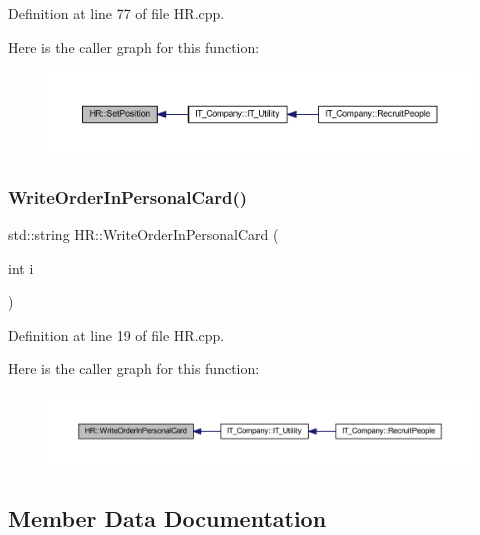 Definition at line 77 of file H\+R.\+cpp.

Here is the caller graph for this function\+:
\nopagebreak
\begin{figure}[H]
\begin{center}
\leavevmode
\includegraphics[width=350pt]{class_h_r_ae092262d1dc245604fdb37fbe5564362_icgraph}
\end{center}
\end{figure}
\mbox{\label{class_h_r_a3c509dc4449f8406ebd4bac482a8b50c}} 
\subsubsection{\texorpdfstring{Write\+Order\+In\+Personal\+Card()}{WriteOrderInPersonalCard()}}
{\footnotesize\ttfamily std\+::string H\+R\+::\+Write\+Order\+In\+Personal\+Card (\begin{DoxyParamCaption}\item[{int}]{i }\end{DoxyParamCaption})}



Definition at line 19 of file H\+R.\+cpp.

Here is the caller graph for this function\+:
\nopagebreak
\begin{figure}[H]
\begin{center}
\leavevmode
\includegraphics[width=350pt]{class_h_r_a3c509dc4449f8406ebd4bac482a8b50c_icgraph}
\end{center}
\end{figure}


\subsection{Member Data Documentation}
\mbox{\label{class_h_r_a3dca2f7facc0c01c245af8a1a1994f37}} 
